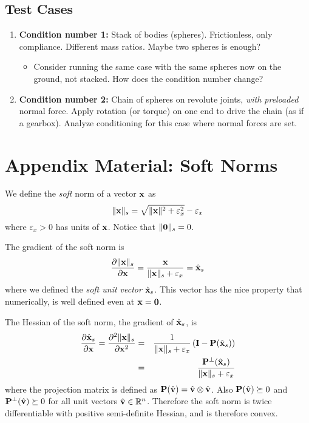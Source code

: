 \subsection{Test Cases}

\begin{enumerate}
    \item \textbf{Condition number 1:} Stack of bodies (spheres). Frictionless, only
    compliance. Different mass ratios. Maybe two spheres is enough? \begin{itemize}
        \item Consider running the same case with the same spheres now on the
        ground, not stacked. How does the condition number change?
    \end{itemize}
    \item \textbf{Condition number 2:} Chain of spheres on revolute joints, \textit{with
    preloaded} normal force. Apply rotation (or torque) on one end to drive the
    chain (as if a gearbox). Analyze conditioning for this case where normal
    forces are set.
\end{enumerate}

\section{Appendix Material: Soft Norms}
\label{sec:soft_norms}

We define the \emph{soft} norm of a vector ${\mathbf{x}}$ as
\begin{equation}
    \Vert\mf{x}\Vert_s = \sqrt{\Vert\mf{x}\Vert^2+\varepsilon_x^2}-\varepsilon_x
    \label{eq:soft_norm_gradient}
\end{equation}
where $\varepsilon_x>0$ has units of ${\mathbf{x}}$. Notice that $\Vert{\mathbf{0}}\Vert_s= 0$.

The gradient of the soft norm is
\begin{equation}
    \frac{\partial\Vert\mf{x}\Vert_s}{\partial \mf{x}} = \frac{\mf{x}}{\Vert\mf{x}\Vert_s+\varepsilon_x} = \hat{\mf{x}}_s
    \label{eq:soft_norm_hessian}
\end{equation}
where we defined the \emph{soft unit vector} $\hat{{\mathbf{x}}}_s$. This vector has the nice property that numerically, is well defined even at ${\mathbf{x}}={\mathbf{0}}$.

The Hessian of the soft norm, the gradient of $\hat{{\mathbf{x}}}_s$, is
\begin{eqnarray}
    \frac{\partial\hat{{\mathbf{x}}}_s}{\partial{\mathbf{x}}}=\frac{\partial^2\Vert{\mathbf{x}}\Vert_s}{\partial{\mathbf{x}}^2}&=&\frac{1}{\Vert{\mathbf{x}}\Vert_s+\varepsilon_x}\left({\mathbf{I}}-{\mathbf{P}}(\hat{{\mathbf{x}}}_s)\right)\nonumber\\
    &=&\frac{{\mathbf{P}}^\perp(\hat{{\mathbf{x}}}_s)}{{\Vert{\mathbf{x}}\Vert_s+\varepsilon_x}}
\end{eqnarray}
where the projection matrix is defined as ${\mathbf{P}}(\hat{{\mathbf{v}}})=\hat{{\mathbf{v}}}\otimes\hat{{\mathbf{v}}}$. Also ${\mathbf{P}}(\hat{{\mathbf{v}}}) \succeq 0$ and ${\mathbf{P}}^\perp(\hat{{\mathbf{v}}}) \succeq 0$ for all unit vectors $\hat{{\mathbf{v}}}\in\mathbb{R}^n$. Therefore the soft norm is twice differentiable with positive semi-definite Hessian, and is therefore convex.

